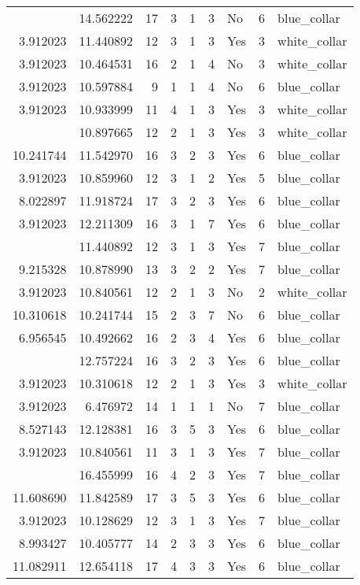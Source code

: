 \documentclass[
]{article}
\begin{document}
\begin{longtable}[t]{rrrrrllrl}
\addlinespace
3.912023 & 14.562222 & 17 & 3 & 1 & 3 & No & 6 & blue\_collar\\
3.912023 & 11.440892 & 12 & 3 & 1 & 3 & Yes & 3 & white\_collar\\
3.912023 & 10.464531 & 16 & 2 & 1 & 4 & No & 3 & white\_collar\\
3.912023 & 10.597884 & 9 & 1 & 1 & 4 & No & 6 & blue\_collar\\
3.912023 & 10.933999 & 11 & 4 & 1 & 3 & Yes & 3 & white\_collar\\
\addlinespace
3.912023 & 10.897665 & 12 & 2 & 1 & 3 & Yes & 3 & white\_collar\\
10.241744 & 11.542970 & 16 & 3 & 2 & 3 & Yes & 6 & blue\_collar\\
3.912023 & 10.859960 & 12 & 3 & 1 & 2 & Yes & 5 & blue\_collar\\
8.022897 & 11.918724 & 17 & 3 & 2 & 3 & Yes & 6 & blue\_collar\\
3.912023 & 12.211309 & 16 & 3 & 1 & 7 & Yes & 6 & blue\_collar\\
\addlinespace
3.912023 & 11.440892 & 12 & 3 & 1 & 3 & Yes & 7 & blue\_collar\\
9.215328 & 10.878990 & 13 & 3 & 2 & 2 & Yes & 7 & blue\_collar\\
3.912023 & 10.840561 & 12 & 2 & 1 & 3 & No & 2 & white\_collar\\
10.310618 & 10.241744 & 15 & 2 & 3 & 7 & No & 6 & blue\_collar\\
6.956545 & 10.492662 & 16 & 2 & 3 & 4 & Yes & 6 & blue\_collar\\
\addlinespace
6.956545 & 12.757224 & 16 & 3 & 2 & 3 & Yes & 6 & blue\_collar\\
3.912023 & 10.310618 & 12 & 2 & 1 & 3 & Yes & 3 & white\_collar\\
3.912023 & 6.476972 & 14 & 1 & 1 & 1 & No & 7 & blue\_collar\\
8.527143 & 12.128381 & 16 & 3 & 5 & 3 & Yes & 6 & blue\_collar\\
3.912023 & 10.840561 & 11 & 3 & 1 & 3 & Yes & 7 & blue\_collar\\
\addlinespace
16.733284 & 16.455999 & 16 & 4 & 2 & 3 & Yes & 7 & blue\_collar\\
11.608690 & 11.842589 & 17 & 3 & 5 & 3 & Yes & 6 & blue\_collar\\
3.912023 & 10.128629 & 12 & 3 & 1 & 3 & Yes & 7 & blue\_collar\\
8.993427 & 10.405777 & 14 & 2 & 3 & 3 & Yes & 6 & blue\_collar\\
11.082911 & 12.654118 & 17 & 4 & 3 & 3 & Yes & 6 & blue\_collar\\

\end{longtable}
\end{document}
